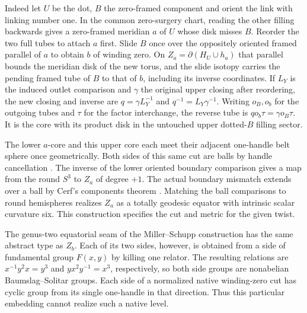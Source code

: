 Indeed let \(U\) be the dot, \(B\) the zero-framed component and orient
the link with linking number one. In the common zero-surgery chart,
reading the other filling backwards gives a zero-framed meridian \(a\)
of \(U\) whose disk misses \(B\). Reorder the two full tubes to
attach \(a\) first. Slide \(B\) once over the oppositely oriented
framed parallel of \(a\) to obtain \(b\) of winding zero. On
\(Z_a=\partial(H_U\cup h_a)\) that parallel bounds the meridian disk
of the new torus, and the slide isotopy carries the pending framed
tube of \(B\) to that of \(b\), including its inverse coordinates.
If \(L_Y\) is the induced outlet comparison and \(\gamma\) the
original upper closing after reordering, the new closing and inverse
are \(q=\gamma L_Y^{-1}\) and \(q^{-1}=L_Y\gamma^{-1}\).
Writing \(o_B,o_b\) for the outgoing tubes and \(\tau\) for the
factor interchange, the reverse tube is
\(q o_b\tau=\gamma o_B\tau\). It is the core with its product disk
in the untouched upper dotted-\(B\) filling sector.

The lower \(a\)-core and this upper core each meet their adjacent
one-handle belt sphere once geometrically. Both sides of this same
cut are balls by handle cancellation
\cite[Theorem 5.4]{Milnor1965HCobordism}. The inverse of the lower
oriented boundary comparison gives a map from the round \(S^3\) to
\(Z_a\) of degree \(+1\). The actual boundary mismatch extends over
a ball by Cerf's components theorem \cite{Hatcher1983Smale}.
Matching the ball comparisons to round hemispheres realizes \(Z_a\)
as a totally geodesic equator with intrinsic scalar curvature six.
This construction specifies the cut and metric for the given twist.

The genus-two equatorial seam of the Miller--Schupp construction has
the same abstract type as \(Z_b\). Each of its two sides, however, is
obtained from a side of fundamental group \(F(x,y)\) by killing one
relator. The resulting relations are \(x^{-1}y^2x=y^3\) and
\(yx^2y^{-1}=x^3\), respectively, so both side groups are nonabelian
Baumslag--Solitar groups. Each side of a normalized native winding-zero
cut has cyclic group from its single one-handle in that direction.
Thus this particular embedding cannot realize such a native level.
